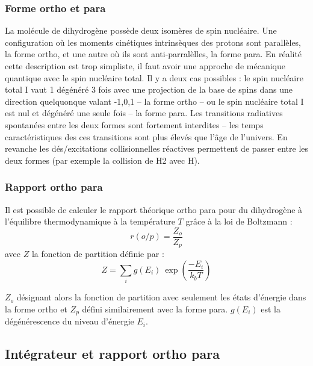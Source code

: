 \documentclass[10pt, a4paper]{report}
\numberwithin{equation}{subsection}
\begin{document}
\subsubsection{Forme ortho et para}
La molécule de dihydrogène possède deux isomères de spin nucléaire. Une configuration où les moments cinétiques intrinsèques des protons sont parallèles, la forme ortho, et une autre où ils sont anti-parralèlles, la forme para. En réalité cette description est trop simpliste, il faut avoir une approche de mécanique quantique avec le spin nucléaire total. Il y a deux cas possibles : le spin nucléaire total I vaut 1 dégénéré 3 fois avec une projection de la base de spins dans une direction quelquonque valant {-1,0,1} -- la forme ortho -- ou le spin nucléaire total I est nul et dégénéré une seule fois -- la forme para. Les transitions radiatives spontanées entre les deux formes sont fortement interdites -- les temps caractéristiques des ces transitions sont plus élevés que l'âge de l'univers. En revanche les dés/excitations collisionnelles réactives permettent de passer entre les deux formes (par exemple la collision de H2 avec H). 
\subsubsection{Rapport ortho para}
Il est possible de calculer le rapport théorique ortho para pour du dihydrogène à l'équilibre thermodynamique à la température $T$ grâce à la loi de Boltzmann :
\begin{equation} \label{eq:EROP}
\boxed{r(o/p) = \frac{Z_o}{Z_p}}
\end{equation}
avec $Z$ la fonction de partition définie par :
\begin{equation} \label{eq:EZ}
 \boxed{Z = \sum\limits_i g(E_i) \ \exp\left(\frac{-E_i}{k_bT}\right)}
\end{equation}
 
$Z_o$ désignant alors la fonction de partition avec seulement les états d'énergie dans la forme ortho et $Z_p$ défini similairement avec la forme para. $g(E_i)$ est la dégénérescence du niveau d'énergie $E_i$.


\subsection{Intégrateur et rapport ortho para}
\end{document}
